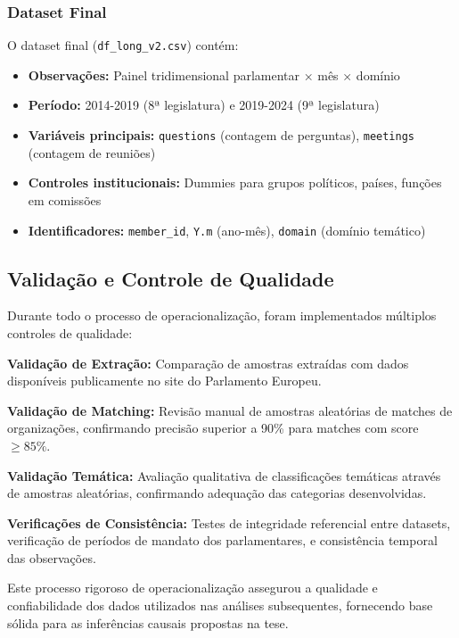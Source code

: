 \subsubsection{Dataset Final}

O dataset final (\texttt{df\_long\_v2.csv}) contém:
\begin{itemize}
    \item \textbf{Observações:} Painel tridimensional parlamentar × mês × domínio
    \item \textbf{Período:} 2014-2019 (8ª legislatura) e 2019-2024 (9ª legislatura)
    \item \textbf{Variáveis principais:} \texttt{questions} (contagem de perguntas), \texttt{meetings} (contagem de reuniões)
    \item \textbf{Controles institucionais:} Dummies para grupos políticos, países, funções em comissões
    \item \textbf{Identificadores:} \texttt{member\_id}, \texttt{Y.m} (ano-mês), \texttt{domain} (domínio temático)
\end{itemize}

\subsection{Validação e Controle de Qualidade}

Durante todo o processo de operacionalização, foram implementados múltiplos controles de qualidade:

\textbf{Validação de Extração:} Comparação de amostras extraídas com dados disponíveis publicamente no site do Parlamento Europeu.

\textbf{Validação de Matching:} Revisão manual de amostras aleatórias de matches de organizações, confirmando precisão superior a 90\% para matches com score $\geq 85\%$.

\textbf{Validação Temática:} Avaliação qualitativa de classificações temáticas através de amostras aleatórias, confirmando adequação das categorias desenvolvidas.

\textbf{Verificações de Consistência:} Testes de integridade referencial entre datasets, verificação de períodos de mandato dos parlamentares, e consistência temporal das observações.

Este processo rigoroso de operacionalização assegurou a qualidade e confiabilidade dos dados utilizados nas análises subsequentes, fornecendo base sólida para as inferências causais propostas na tese.